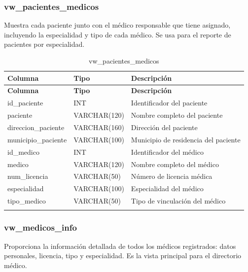 \documentclass[12pt,a4paper]{article}
\begin{document}
\subsubsection{vw\_pacientes\_medicos}
Muestra cada paciente junto con el m\'edico responsable que tiene asignado, incluyendo la especialidad y tipo de cada m\'edico. Se usa para el reporte de pacientes por especialidad.

{\small\begin{longtable}{|p{2.3cm}|p{3.3cm}|p{8cm}|}
\hline
\textbf{Columna} & \textbf{Tipo} & \textbf{Descripci\'on} \\ \hline
\endfirsthead
\hline
\textbf{Columna} & \textbf{Tipo} & \textbf{Descripci\'on} \\ \hline
\endhead
id\_paciente & INT & Identificador del paciente \\ \hline
paciente & VARCHAR(120) & Nombre completo del paciente \\ \hline
direccion\_paciente & VARCHAR(160) & Direcci\'on del paciente \\ \hline
municipio\_paciente & VARCHAR(100) & Municipio de residencia del paciente \\ \hline
id\_medico & INT & Identificador del m\'edico \\ \hline
medico & VARCHAR(120) & Nombre completo del m\'edico \\ \hline
num\_licencia & VARCHAR(50) & N\'umero de licencia m\'edica \\ \hline
especialidad & VARCHAR(100) & Especialidad del m\'edico \\ \hline
tipo\_medico & VARCHAR(50) & Tipo de vinculaci\'on del m\'edico \\ \hline
\caption{vw\_pacientes\_medicos}
\end{longtable}}

\subsubsection{vw\_medicos\_info}
Proporciona la informaci\'on detallada de todos los m\'edicos registrados: datos personales, licencia, tipo y especialidad. Es la vista principal para el directorio m\'edico.
\end{document}
